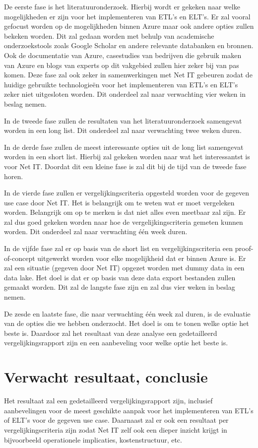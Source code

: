 De eerste fase is het literatuuronderzoek. Hierbij wordt er gekeken naar welke mogelijkheden er zijn voor het implementeren van ETL's en ELT's. Er zal vooral gefocust worden op de mogelijkheden binnen Azure maar ook andere opties zullen bekeken worden. Dit zal gedaan worden met behulp van academische onderzoekstools zoals Google Scholar en andere relevante databanken en bronnen. Ook de documentatie van Azure, casestudies van bedrijven die gebruik maken van Azure en blogs van experts op dit vakgebied zullen hier zeker bij van pas komen. Deze fase zal ook zeker in samenwerkingen met Net IT gebeuren zodat de huidige gebruikte technologieën voor het implementeren van ETL's en ELT's zeker niet uitgesloten worden. Dit onderdeel zal naar verwachting vier weken in beslag nemen. 

In de tweede fase zullen de resultaten van het literatuuronderzoek samengevat worden in een long list. Dit onderdeel zal naar verwachting twee weken duren.

In de derde fase zullen de meest interessante opties uit de long list samengevat worden in een short list. Hierbij zal gekeken worden naar wat het interessantst is voor Net IT. Doordat dit een kleine fase is zal dit bij de tijd van de tweede fase horen.

In de vierde fase zullen er vergelijkingscriteria opgesteld worden voor de gegeven use case door Net IT. Het is belangrijk om te weten wat er moet vergeleken worden. Belangrijk om op te merken is dat niet alles even meetbaar zal zijn. Er zal dus goed gekeken worden naar hoe de vergelijkingscriteria gemeten kunnen worden. Dit onderdeel zal naar verwachting één week duren.

In de vijfde fase zal er op basis van de short list en vergelijkingscriteria een proof-of-concept uitgewerkt worden voor elke mogelijkheid dat er binnen Azure is. Er zal een situatie (gegeven door Net IT) opgezet worden met dummy data in een data lake. Het doel is dat er op basis van deze data export bestanden zullen gemaakt worden. Dit zal de langste fase zijn en zal dus vier weken in beslag nemen.

De zesde en laatste fase, die naar verwachting één week zal duren, is de evaluatie van de opties die we hebben onderzocht. Het doel is om te tonen welke optie het beste is. Daardoor zal het resultaat van deze analyse een gedetailleerd vergelijkingsrapport zijn en een aanbeveling voor welke optie het beste is.


\section{Verwacht resultaat, conclusie}%
\label{sec:verwachte_resultaten}

Het resultaat zal een gedetailleerd vergelijkingsrapport zijn, inclusief aanbevelingen voor de meest geschikte aanpak voor het implementeren van ETL's of ELT's voor de gegeven use case. Daarnaast zal er ook een resultaat per vergelijkingscriteria zijn zodat Net IT zelf ook een dieper inzicht krijgt in bijvoorbeeld operationele implicaties, kostenstructuur, etc.
